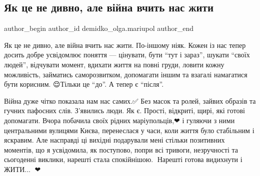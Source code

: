  
 
 
 
 

\subsection{Як це не дивно, але війна вчить нас жити}
\label{sec:06_02_2023.fb.demidko_olga.mariupol.1.jak_ce_ne_dyvno_ale_vijna_vchyt_nas_zhyty}

\ifcmt
 author_begin
   author_id demidko_olga.mariupol
 author_end
\fi

Як це не дивно, але війна вчить нас жити. По-іншому ніяк. Кожен із нас тепер
досить добре усвідомлює поняття — цінувати, бути \enquote{тут і зараз}, шукати \enquote{своїх
людей}, відчувати момент, вдихати життя на повні груди, ловити кожну
можливість, займатись саморозвитком, допомагати іншим та взагалі намагатися
бути корисним. 😌Тільки це \enquote{до}.  А тепер є \enquote{після}. 

Війна дуже чітко показала нам нас самих.✅ Без масок та ролей, зайвих образів
та гучних пафосних слів. З'явились люди. Як є. Прості, відкриті, щирі, які
готові допомагати. Вчора побачила своїх рідних маріупольців,❤ і гуляючи з ними
центральними вулицями Києва, перенеслася  у часи, коли життя було стабільним і
яскравим. Але насправді ці вихідні подарували мені стільки позитивних моментів,
що я усвідомила, як поступово, попри всі тривоги, незручності та сьогоденні
виклики, нарешті стала спокійнішою.🥰 Нарешті готова видихнути і ЖИТИ... 🙏❤

